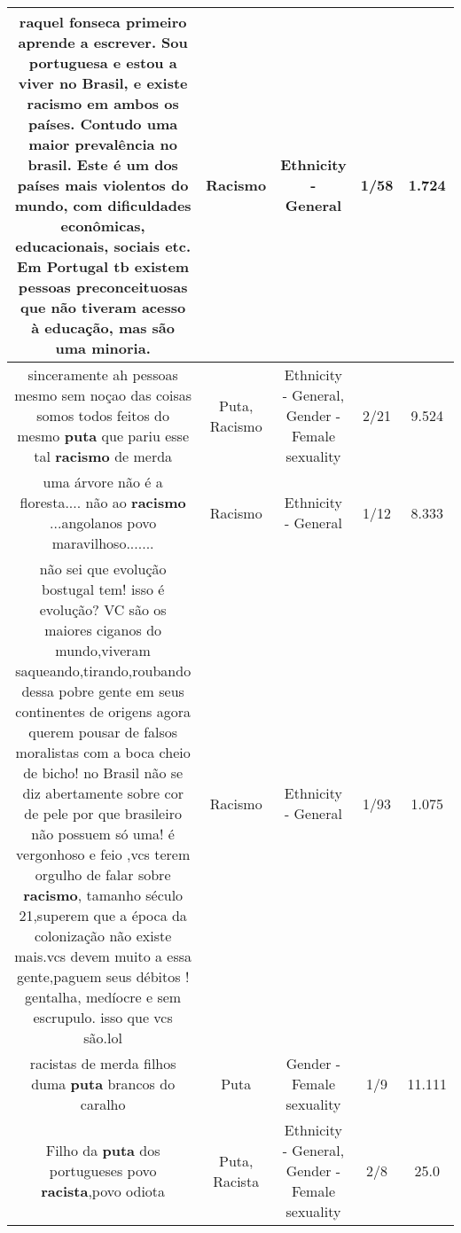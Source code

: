 \documentclass[11pt]{article}
\newlength\mylength
\begin{document}
\begin{center}
\begin{longtable}{|C{.65\mylength}|C{.30\mylength}|C{.12\mylength}|C{.12\mylength}|C{.12\mylength}|}
  \small raquel fonseca primeiro aprende a escrever. Sou portuguesa e estou a viver no Brasil, e existe \textbf{racismo} em ambos os países. Contudo uma maior prevalência no brasil. Este é um dos países mais violentos do mundo, com dificuldades econômicas, educacionais, sociais etc. Em Portugal tb existem pessoas preconceituosas que não tiveram acesso à educação,  mas são uma minoria.\normalsize   & Racismo & Ethnicity - General & 1/58 & 1.724 \\  \hline
  \small sinceramente ah pessoas mesmo sem noçao das coisas somos todos feitos do mesmo \textbf{puta} que pariu esse tal \textbf{racismo} de merda\normalsize   & Puta, Racismo & Ethnicity - General, Gender - Female sexuality & 2/21 & 9.524 \\  \hline
  \small uma árvore não é a floresta....  não ao \textbf{racismo} ...angolanos povo maravilhoso.......\normalsize   & Racismo & Ethnicity - General & 1/12 & 8.333 \\  \hline
  \small não sei que evolução bostugal tem!   isso é evolução? VC são os maiores ciganos do mundo,viveram saqueando,tirando,roubando dessa pobre gente em seus continentes de origens agora querem pousar de falsos moralistas com a boca cheio de bicho! no Brasil não se diz abertamente sobre cor de pele por que brasileiro não possuem só uma! é vergonhoso e feio ,vcs terem orgulho de falar sobre \textbf{racismo}, tamanho século 21,superem que a época da colonização  não existe mais.vcs devem muito a essa gente,paguem seus débitos ! gentalha,  medíocre e sem escrupulo. isso que vcs são.lol\normalsize   & Racismo & Ethnicity - General & 1/93 & 1.075 \\  \hline
  \small racistas de merda filhos duma \textbf{puta} brancos do caralho\normalsize   & Puta & Gender - Female sexuality & 1/9 & 11.111 \\  \hline
  \small Filho da \textbf{puta} dos portugueses povo \textbf{racista},povo odiota\normalsize   & Puta, Racista & Ethnicity - General, Gender - Female sexuality & 2/8 & 25.0 \\  \hline

\end{longtable}
\end{center}
\end{document}
